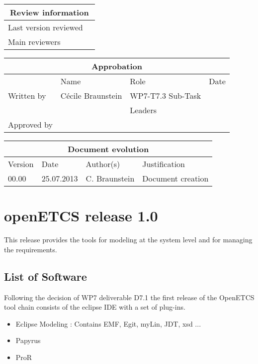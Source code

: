 \documentclass{openetcs_report}
\begin{document}
\begin{tabular}{|p{4.4cm}|p{8.7cm}|}
\hline
\multicolumn{2}{|c|}{Review information} \\
\hline
Last version reviewed &  \\
\hline
Main reviewers & \\
\hline
\end{tabular}

\begin{tabular}{|p{2.2cm}|p{4cm}|p{4cm}|p{2cm}|}
\hline
\multicolumn{4}{|c|}{Approbation} \\
\hline
  &  Name & Role & Date   \\
\hline  
Written by    &  Cécile Braunstein & WP7-T7.3 Sub-Task  & \\
&  & Leaders&\\
\hline
Approved by & &  & \\
\hline
\end{tabular}

\begin{tabular}{|p{2.2cm}|p{2cm}|p{3cm}|p{5cm}|}
\hline
\multicolumn{4}{|c|}{Document evolution} \\
\hline
Version &  Date & Author(s) & Justification  \\
\hline  
00.00 & 25.07.2013 & C. Braunstein  &  Document creation  \\
\hline  
\end{tabular}
\newpage


\mainmatter
\chapter{openETCS release 1.0}

This release provides the tools for modeling at the system level and
for managing the requirements.


\section{List of Software}
Following the decision of WP7 deliverable D7.1 the first release of
the OpenETCS tool chain consists of the eclipse IDE with a set of plug-ins.

\begin{itemize}
\item Eclipse Modeling : Contains EMF, Egit, myLin, JDT, xsd ... 
\item Papyrus
\item ProR
\end{itemize}
\end{document}

